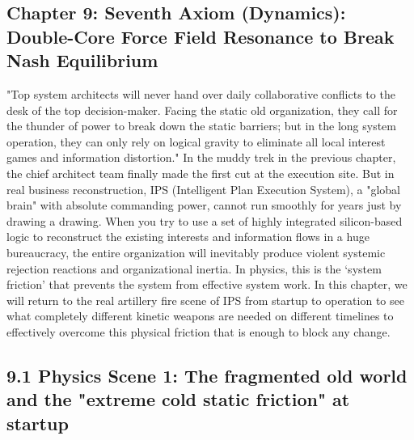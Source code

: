 \documentclass[11pt,a4paper]{article}
\begin{document}
\subsection*{Chapter 9: Seventh Axiom (Dynamics): Double-Core Force Field Resonance to Break Nash Equilibrium}
"Top system architects will never hand over daily collaborative conflicts to the desk of the top decision-maker. Facing the static old organization, they call for the thunder of power to break down the static barriers; but in the long system operation, they can only rely on logical gravity to eliminate all local interest games and information distortion." In the muddy trek in the previous chapter, the chief architect team finally made the first cut at the execution site. But in real business reconstruction, IPS (Intelligent Plan Execution System), a "global brain" with absolute commanding power, cannot run smoothly for years just by drawing a drawing. When you try to use a set of highly integrated silicon-based logic to reconstruct the existing interests and information flows in a huge bureaucracy, the entire organization will inevitably produce violent systemic rejection reactions and organizational inertia. In physics, this is the ‘system friction’ that prevents the system from effective system work. In this chapter, we will return to the real artillery fire scene of IPS from startup to operation to see what completely different kinetic weapons are needed on different timelines to effectively overcome this physical friction that is enough to block any change.


\subsection*{9.1 Physics Scene 1: The fragmented old world and the "extreme cold static friction" at startup}
\end{document}
